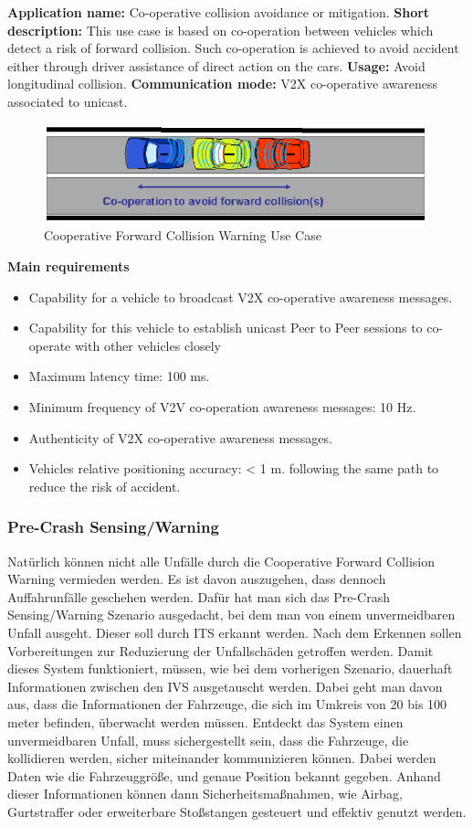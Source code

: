 \textbf{Application name:} Co-operative collision avoidance or mitigation.
\textbf{Short description:} This use case is based on co-operation between vehicles which detect a risk of forward collision.
Such co-operation is achieved to avoid accident either through driver assistance of direct action on the cars.
\textbf{Usage:} Avoid longitudinal collision.
\textbf{Communication mode:} V2X co-operative awareness associated to unicast.
\begin{figure}[htbp]
\includegraphics[width=0.99\textwidth]{content/images/06_use_cases/colissionwarning.png}
\caption{Cooperative Forward Collision Warning Use Case\cite{etsi102638}}
\label{fig:cfcw}
\end{figure}
\textbf{Main requirements}
\begin{itemize}
\item Capability for a vehicle to broadcast V2X co-operative awareness messages.
\item Capability for this vehicle to establish unicast Peer to Peer sessions to co-operate with other vehicles closely
\item Maximum latency time: 100 ms.
\item Minimum frequency of V2V co-operation awareness messages: 10 Hz.
\item Authenticity of V2X co-operative awareness messages.
\item Vehicles relative positioning accuracy: < 1 m.
following the same path to reduce the risk of accident.
\end{itemize}

\subsubsection{Pre-Crash Sensing/Warning}
Natürlich können nicht alle Unfälle durch die Cooperative Forward Collision Warning vermieden werden. Es ist davon auszugehen, dass dennoch Auffahrunfälle geschehen werden. Dafür hat man sich das Pre-Crash Sensing/Warning Szenario ausgedacht, bei dem man von einem unvermeidbaren Unfall ausgeht. Dieser soll durch \ac{ITS} erkannt werden. Nach dem Erkennen sollen Vorbereitungen zur Reduzierung der Unfallschäden getroffen werden. Damit dieses System funktioniert, müssen, wie bei dem vorherigen Szenario, dauerhaft Informationen zwischen den \ac{IVS} ausgetauscht werden. Dabei geht man davon aus, dass die Informationen der Fahrzeuge, die sich im Umkreis von 20 bis 100 meter befinden, überwacht werden müssen. Entdeckt das System einen unvermeidbaren Unfall, muss sichergestellt sein, dass die Fahrzeuge, die kollidieren werden, sicher miteinander kommunizieren können. Dabei werden Daten wie die Fahrzeuggröße, und genaue Position bekannt gegeben. Anhand dieser Informationen können dann Sicherheitsmaßnahmen, wie Airbag, Gurtstraffer oder erweiterbare Stoßstangen gesteuert und effektiv genutzt werden. 


